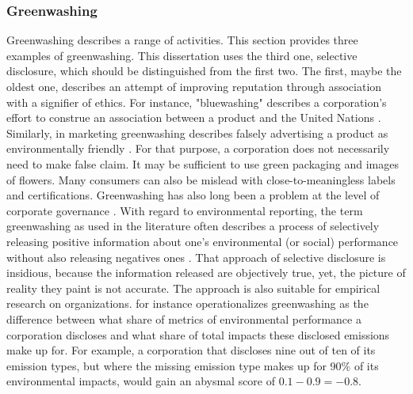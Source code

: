 \subsubsection{Greenwashing}

Greenwashing describes a range of activities. This section provides three examples of greenwashing. This dissertation uses the third one, selective disclosure, which should be distinguished from the first two. The first, maybe the oldest one, describes an attempt of improving reputation through association with a signifier of ethics. For instance, "bluewashing" describes a corporation's effort to construe an association between a product and the United Nations \citep{Laufer2003}. 
Similarly, in marketing greenwashing describes falsely advertising a product as environmentally friendly \citep{Delmas2011}. For that purpose, a corporation does not necessarily need to make false claim. It may be sufficient to use green packaging and images of flowers. Many consumers can also be mislead with close-to-meaningless labels and certifications. 
Greenwashing has also long been a problem at the level of corporate governance \citep{Ramus2005}. With regard to environmental reporting, the term greenwashing as used in the literature often describes a process of selectively releasing positive information about one's environmental (or social) performance without also releasing negatives ones \citep{Lyon2011}. That approach of selective disclosure is insidious, because the information released are objectively true, yet, the picture of reality they paint is not accurate. The approach is also suitable for empirical research on organizations. \citet{Marquis2016} for instance operationalizes greenwashing as the difference between what share of metrics of environmental performance a corporation discloses and what share of total impacts these disclosed emissions make up for. For example, a corporation that discloses nine out of ten of its emission types, but where the missing emission type makes up for 90\% of its environmental impacts, would gain an abysmal score of $0.1 - 0.9 = -0.8$.

